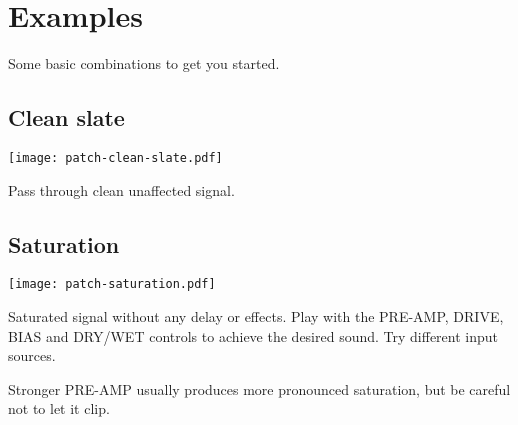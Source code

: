 \documentclass[11pt]{article}
\begin{document}
\newpage
\section{Examples}

Some basic combinations to get you started.

\noindent\begin{minipage}[t]{0.45\textwidth}\setlength{\parskip}{6pt}

\subsection{Clean slate}

\vspace{5mm}\begin{center}\texttt{[image: patch-clean-slate.pdf]}\vspace{5mm}\end{center}

Pass through clean unaffected signal.

\end{minipage}\begin{minipage}{0.05\textwidth}\phantom{ }\end{minipage}\begin{minipage}[t]{0.45\textwidth}\setlength{\parskip}{6pt}

\subsection{Saturation}

\vspace{5mm}\begin{center}\texttt{[image: patch-saturation.pdf]}\vspace{5mm}\end{center}

Saturated signal without any delay or effects. Play with the PRE-AMP, DRIVE,
BIAS and DRY/WET controls to achieve the desired sound. Try different input
sources.

Stronger PRE-AMP usually produces more pronounced saturation, but be careful
not to let it clip.

\end{minipage}
\end{document}
